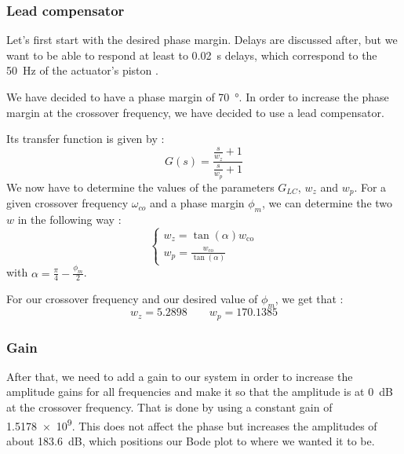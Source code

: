 \subsubsection{Lead compensator}
Let's first start with the desired phase margin. Delays are discussed after, but we want to be able to respond at least to \SI{0.02}{\second} delays, which correspond to the \SI{50}{\hertz} of the actuator's piston \cite{iopscience_delay}.\par
We have decided to have a phase margin of \SI{70}{\degree}. In order to increase the phase margin at the crossover frequency, we have decided to use a lead compensator.\par
Its transfer function is given by : 
$$
G(s) = \dfrac{\frac{s}{w_z} + 1}{\frac{s}{w_p} +1}
$$
We now have to determine the values of the parameters $G_{LC}$, $w_z$ and $w_p$. For a given crossover frequency $\omega_{co}$ and a phase margin $\phi_m$, we can determine the two $w$ in the following way : 
$$
\left\{\begin{array}{l}
    {w_{z}=\tan (\alpha) w_{\mathrm{co}}} \\
    {w_{p}=\frac{w_{\mathrm{co}}}{\tan (\alpha)}}
\end{array}\right.
$$
with $\alpha = \frac{\pi}{4} - \frac{\phi_m}{2}$.\par
For our crossover frequency and our desired value of $\phi_m$, we get that : 
$$
w_z = \num{5.2898} \qquad w_p = \num{170.1385}
$$

\subsubsection{Gain}
After that, we need to add a gain to our system in order to increase the amplitude gains for all frequencies and make it so that the amplitude is at \SI{0}{\deci\bel} at the crossover frequency. That is done by using a constant gain of \num{1.5178e9}. This does not affect the phase but increases the amplitudes of about \SI{183.6}{\deci\bel}, which positions our Bode plot to where we wanted it to be.

